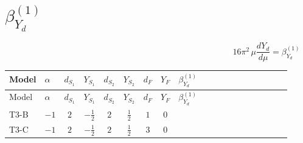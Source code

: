 \documentclass{article}
\begin{document}
\begin{landscape}
\begin{longtable}{@{}llcccccc >{\raggedright\arraybackslash}p{0.54\linewidth}@{}}
\midrule
\bottomrule
\end{longtable}
\clearpage
\section*{$\beta_{Y_d}^{(1)}$}
\[16\pi^2\,\mu\frac{d Y_d}{d\mu}=\beta_{Y_d}^{(1)}\]
\tiny
\begin{longtable}{@{}llcccccc >{\raggedright\arraybackslash}p{0.54\linewidth}@{}}
\toprule
Model & $\alpha$ & $d_{S_1}$ & $Y_{S_1}$ & $d_{S_2}$ & $Y_{S_2}$ & $d_F$ & $Y_F$ & $\beta_{Y_d}^{(1)}$ \\
\midrule
\endfirsthead
\toprule
Model & $\alpha$ & $d_{S_1}$ & $Y_{S_1}$ & $d_{S_2}$ & $Y_{S_2}$ & $d_F$ & $Y_F$ & $\beta_{Y_d}^{(1)}$ \\
\midrule
\endhead
T3-B & $-1$ & $2$ & $-\frac{1}{2}$ & $2$ & $\frac{1}{2}$ & $1$ & $0$ & \scriptsize\adjustbox{max width=\linewidth}{$\begin{gathered} \operatorname{Tr}\!\left({Y_e}\,\left({Y_e}\right)^{\dagger}\right) \left({Y_d}\right)_{ij} \\ +3 \operatorname{Tr}\!\left({Y_u}\,\left({Y_u}\right)^{\dagger}\right) \left({Y_d}\right)_{ij} \\ +3 \operatorname{Tr}\!\left({Y_d}\,\left({Y_d}\right)^{\dagger}\right) \left({Y_d}\right)_{ij} \\ +\frac{3}{2} (\left({Y_d}\,\left({Y_d}\right)^{\dagger}\,{Y_d}\right)_{ij}-\left({Y_u}\,\left({Y_u}\right)^{\dagger}\,{Y_d}\right)_{ij}) \\ -\frac{9}{4} {g_2}^2 \left({Y_d}\right)_{ij} \\ -8 {g_3}^2 \left({Y_d}\right)_{ij} \\ -\frac{5}{12} {g_Y}^2 \left({Y_d}\right)_{ij}\end{gathered}$} \\
\midrule
T3-C & $-1$ & $2$ & $-\frac{1}{2}$ & $2$ & $\frac{1}{2}$ & $3$ & $0$ & \scriptsize\adjustbox{max width=\linewidth}{$\begin{gathered} \operatorname{Tr}\!\left({Y_e}\,\left({Y_e}\right)^{\dagger}\right) \left({Y_d}\right)_{ij} \\ +3 \operatorname{Tr}\!\left({Y_u}\,\left({Y_u}\right)^{\dagger}\right) \left({Y_d}\right)_{ij} \\ +3 \operatorname{Tr}\!\left({Y_d}\,\left({Y_d}\right)^{\dagger}\right) \left({Y_d}\right)_{ij} \\ +\frac{3}{2} (\left({Y_d}\,\left({Y_d}\right)^{\dagger}\,{Y_d}\right)_{ij}-\left({Y_u}\,\left({Y_u}\right)^{\dagger}\,{Y_d}\right)_{ij}) \\ -\frac{9}{4} {g_2}^2 \left({Y_d}\right)_{ij} \\ -8 {g_3}^2 \left({Y_d}\right)_{ij} \\ -\frac{5}{12} {g_Y}^2 \left({Y_d}\right)_{ij}\end{gathered}$} \\

\end{longtable}
\end{landscape}
\end{document}
